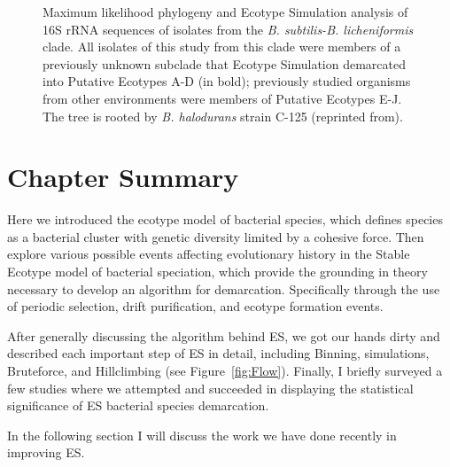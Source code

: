 \begin{figure}[h!]
\caption[Example ES analysis of 16s rRNA sequences of isolates from the \emph{B. subtilis-B.licheniformis} clade.]{Maximum likelihood phylogeny and Ecotype Simulation analysis of 16S rRNA sequences of isolates from the \emph{B. subtilis-B. licheniformis} clade. All isolates of this study from this clade were members of a previously unknown subclade that Ecotype Simulation demarcated into Putative Ecotypes A-D (in bold); previously studied organisms from other environments were members of Putative Ecotypes E-J. The tree is rooted by \emph{B. halodurans} strain C-125 (reprinted from\protect\cite{kim2012diversity}).}
\label{fig:DeathES}
\end{figure}

\section{Chapter Summary}
Here we introduced the ecotype model of bacterial species, which defines species as a bacterial cluster with genetic diversity limited by a cohesive force.
Then explore various possible events affecting evolutionary history in the Stable Ecotype model of bacterial speciation, which provide the grounding in theory necessary to develop an algorithm for demarcation.
Specifically through the use of periodic selection, drift purification, and ecotype formation events.

After generally discussing the algorithm behind ES, we got our hands dirty and described each important step of ES in detail, including Binning, simulations, Bruteforce, and Hillclimbing (see Figure~\ref{fig:Flow}).
Finally, I briefly surveyed a few studies where we attempted and succeeded in displaying the statistical significance of ES bacterial species demarcation.

In the following section I will discuss the work we have done recently in improving ES.




